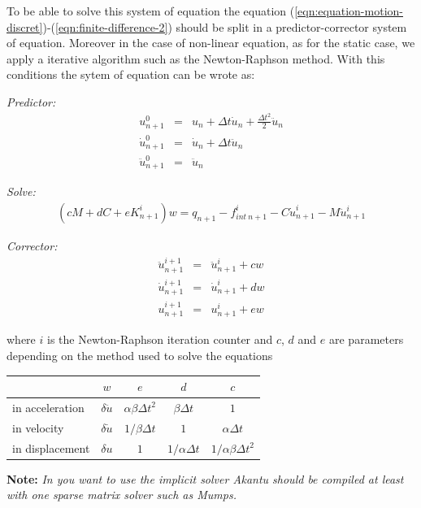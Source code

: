 \documentclass[a4paper,11pt]{book}
\newcommand{\note}[1]{\textbf{Note: }\textit{#1}}
\begin{document}
To   be    able   to    solve   this   system    of   equation    the   equation
(\ref{eqn:equation-motion-discret})-(\ref{eqn:finite-difference-2})   should  be
split  in a predictor-corrector  system of  equation.  Moreover  in the  case of
non-linear equation, as for the static case, we apply a iterative algorithm such
as the Newton-Raphson method. With this  conditions the sytem of equation can be
wrote as:


\noindent\textit{Predictor:}
\begin{eqnarray}
  u^{0}_{n+1}        &=& u_{n} +  \Delta t \dot{u}_n + \frac{\Delta t^2}{2} \ddot{u}_n \\
  \dot{u}^{0}_{n+1}  &=& \dot{u}_{n} +  \Delta t \ddot{u}_{n} \\
  \ddot{u}^{0}_{n+1} &=& \ddot{u}_{n}
\end{eqnarray}

\noindent\textit{Solve:}
\begin{eqnarray}
 (c M + d C + e K^i_{n+1}) w = q_{n+1} - f^i_{int~n+1} - C \dot{u}^i_{n+1} - M \ddot{u}^i_{n+1}
\end{eqnarray}

\noindent\textit{Corrector:}
\begin{eqnarray}
  \ddot{u}^{i+1}_{n+1} &=& \ddot{u}^{i}_{n+1} + c w \\
  \dot{u}^{i+1}_{n+1} &=& \dot{u}^{i}_{n+1} + d w \\
  u^{i+1}_{n+1} &=& u^{i}_{n+1} + e w
\end{eqnarray}

where  $i$ is  the Newton-Raphson  iteration counter  and $c$,  $d$ and  $e$ are
parameters depending on the method used to solve the equations

\begin{center}
  \begin{tabular}{l|c|c|c|c}
    & $w$ & $e$ & $d$ & $c$\\
    \hline
    in acceleration &$ \delta \ddot{u}$ & $\alpha \beta \Delta t^2$ &$\beta \Delta t$ &$1$\\
    in velocity & $ \delta \dot{u}$& $1/\beta \Delta t$ & $1$ & $\alpha \Delta t$\\
    in displacement &$\delta u$ & $ 1$ & $1/\alpha \Delta t$ & $1/\alpha \beta \Delta t^2$
  \end{tabular}
\end{center}

\note{In you want to use the  implicit solver Akantu should be compiled at least
  with one sparse matrix solver such as Mumps\cite{mumps}.}
\end{document}
